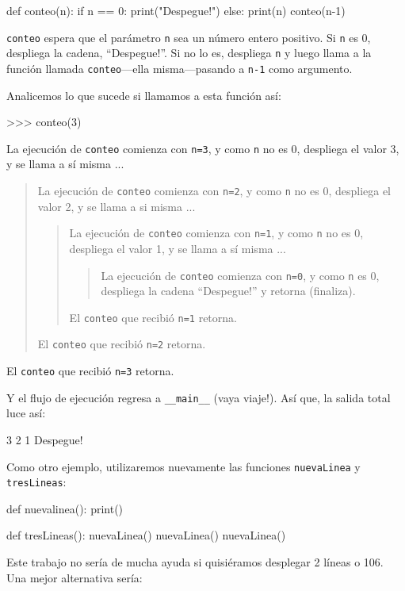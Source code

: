 \begin{pythoncode}
def conteo(n):
  if n == 0:
    print("Despegue!")
  else:
    print(n)
    conteo(n-1)
\end{pythoncode}

\texttt{conteo} espera que el parámetro \texttt{n} sea un número entero
positivo. Si \texttt{n} es 0, despliega la cadena, ``Despegue!''.
Si no lo es, despliega \texttt{n} y luego llama a la función llamada
\texttt{conteo}—ella misma—pasando a \texttt{n-1} como argumento.

Analicemos lo que sucede si llamamos a esta función así:
\begin{pyconcode}
>>> conteo(3)
\end{pyconcode}

La ejecución de \texttt{conteo} comienza con \texttt{n=3}, y como
\texttt{n} no es 0, despliega el valor 3, y se llama a sí misma ...
\begin{quote}
La ejecución de \texttt{conteo} comienza con \texttt{n=2}, y como
\texttt{n} no es 0, despliega el valor 2, y se llama a si misma ...

\begin{quote}
La ejecución de \texttt{conteo} comienza con \texttt{n=1}, y como
\texttt{n} no es 0, despliega el valor 1, y se llama a sí misma ...

\begin{quote}
La ejecución de \texttt{conteo} comienza con \texttt{n=0}, y como
\texttt{n} es 0, despliega la cadena ``Despegue!'' y retorna (finaliza). 
\end{quote}
El \texttt{conteo} que recibió \texttt{n=1} retorna. 
\end{quote}
El \texttt{conteo} que recibió \texttt{n=2} retorna. 
\end{quote}
El \texttt{conteo} que recibió \texttt{n=3} retorna.

Y el flujo de ejecución regresa a \texttt{\_\_main\_\_} (vaya viaje!).
Así que, la salida total luce así:
\begin{pythoncode}
3
2
1
Despegue!
\end{pythoncode}
Como otro ejemplo, utilizaremos nuevamente las funciones \texttt{nuevaLinea}
y \texttt{tresLineas}:

\begin{pythoncode}
def nuevalinea():
  print()

def tresLineas():
  nuevaLinea()
  nuevaLinea()
  nuevaLinea()
\end{pythoncode}

Este trabajo no sería de mucha ayuda si quisiéramos desplegar 2 líneas
o 106. Una mejor alternativa sería:

